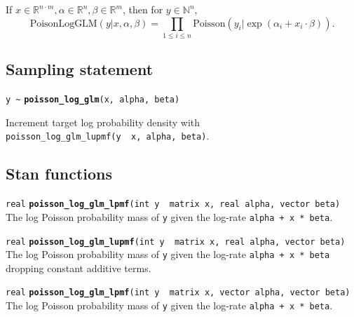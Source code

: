 \documentclass[
  10pt,
]{book}
\begin{document}
If \(x\in \mathbb{R}^{n\cdot m}, \alpha \in \mathbb{R}^n, \beta\in \mathbb{R}^m\), then for \(y \in \mathbb{N}^n\), \[
\text{PoisonLogGLM}(y|x, \alpha, \beta) = \prod_{1\leq i \leq
n}\text{Poisson}(y_i|\exp(\alpha_i + x_i\cdot \beta)). \]

\hypertarget{sampling-statement-19}{%
\subsection{Sampling statement}\label{sampling-statement-19}}

\texttt{y\ \textasciitilde{}} \textbf{\texttt{poisson\_log\_glm}}\texttt{(x,\ alpha,\ beta)}

Increment target log probability density with \texttt{poisson\_log\_glm\_lupmf(y\ \textbar{}\ x,\ alpha,\ beta)}.

\hypertarget{stan-functions-18}{%
\subsection{Stan functions}\label{stan-functions-18}}


\texttt{real} \textbf{\texttt{poisson\_log\_glm\_lpmf}}\texttt{(int\ y\ \textbar{}\ matrix\ x,\ real\ alpha,\ vector\ beta)}\newline
The log Poisson probability mass of \texttt{y} given the log-rate \texttt{alpha\ +\ x\ *\ beta}.


\texttt{real} \textbf{\texttt{poisson\_log\_glm\_lupmf}}\texttt{(int\ y\ \textbar{}\ matrix\ x,\ real\ alpha,\ vector\ beta)}\newline
The log Poisson probability mass of \texttt{y} given the log-rate \texttt{alpha\ +\ x\ *\ beta}
dropping constant additive terms.


\texttt{real} \textbf{\texttt{poisson\_log\_glm\_lpmf}}\texttt{(int\ y\ \textbar{}\ matrix\ x,\ vector\ alpha,\ vector\ beta)}\newline
The log Poisson probability mass of \texttt{y} given the log-rate \texttt{alpha\ +\ x\ *\ beta}.
\end{document}
